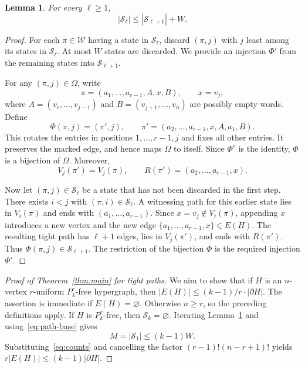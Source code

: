 \documentclass[11pt]{article}
\newtheorem{lemma}[theorem]{Lemma}
\theoremstyle{remark}
\numberwithin{equation}{section}
\newcommand{\sh}{\partial}
\newcommand{\Wcal}{\mathcal W}
\newcommand{\Scal}{\mathcal S}
\begin{document}
	\begin{lemma}\label{lem:path-transfer}
		For every $\ell\ge1$,
		\begin{equation}\label{eq:path-transfer}
			|\Scal_\ell|\le |\Scal_{\ell+1}|+W.
		\end{equation}
	\end{lemma}
	
	\begin{proof}
		For each $\pi\in\Wcal$ having a state in $\Scal_\ell$, discard
		$(\pi,j)$ with $j$ least among its states in $\Scal_\ell$.
		At most $W$ states are discarded. We provide an injection $\Phi'$ from the remaining states
		into $\Scal_{\ell+1}$.
		
		For any $(\pi,j)\in\Omega$, write
		\[
		\pi=(a_1,\ldots,a_{r-1},A,x,B),\qquad x=v_j,
		\]
		where $A=(v_r,\ldots,v_{j-1})$ and $B=(v_{j+1},\ldots,v_n)$
		are possibly empty words. Define
		\begin{equation}\label{eq:path-rotation}
			\Phi(\pi,j)=(\pi',j),\qquad
			\pi'=(a_2,\ldots,a_{r-1},x,A,a_1,B).
		\end{equation}
		This rotates the entries in positions $1,\ldots,r-1,j$ and fixes
		all other entries. It preserves the marked edge, and hence maps
		$\Omega$ to itself. Since $\Phi^r$ is the identity, $\Phi$ is a
		bijection of $\Omega$. Moreover,
		\begin{equation}\label{eq:path-support}
			V_j(\pi')=V_j(\pi),\qquad
			R(\pi')=(a_2,\ldots,a_{r-1},x).
		\end{equation}
		
		Now let $(\pi,j)\in\Scal_\ell$ be a state that has not been discarded in the first step. There exists
		$i<j$ with $(\pi,i)\in\Scal_\ell$. A witnessing path for this
		earlier state lies in $V_i(\pi)$ and ends with
		$(a_1,\ldots,a_{r-1})$. Since $x=v_j\notin V_i(\pi)$, appending
		$x$ introduces a new vertex and the new edge
		$\{a_1,\ldots,a_{r-1},x\}\in E(H)$.
		The resulting tight path has $\ell+1$ edges, lies in $V_j(\pi')$,
		and ends with $R(\pi')$. Thus $\Phi(\pi,j)\in\Scal_{\ell+1}$.
		The restriction of the bijection $\Phi$ is the required injection $\Phi'$.
	\end{proof}
	
	\begin{proof}[Proof of Theorem~\ref{thm:main} for tight paths]
		We aim to show that if $H$ is an $n$-vertex $r$-uniform $P_k^r$-free hypergraph, then $|E(H)| \leq (k - 1)/r \cdot |\sh H|$. The assertion is immediate if $E(H)=\varnothing$. Otherwise
		$n\ge r$, so the preceding definitions apply. If $H$ is
		$P_k^r$-free, then $\Scal_k=\varnothing$. Iterating
		Lemma~\ref{lem:path-transfer} and using~\eqref{eq:path-base} gives
		\[
		M=|\Scal_1|\le (k-1)W.
		\]
		Substituting~\eqref{eq:counts} and cancelling the factor
		$(r-1)!(n-r+1)!$ yields $r|E(H)|\le(k-1)|\sh H|$. \end{proof}
	
\end{document}
